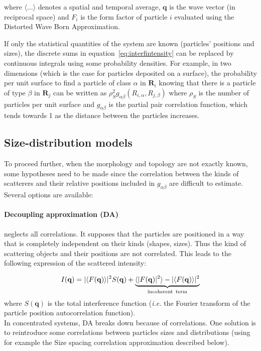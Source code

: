 where $\langle\ldots\rangle$ denotes a spatial and temporal average, $\mathbf{q}$ is the wave vector (in reciprocal space) and $F_i$ is the form factor of particle $i$ evaluated using the Distorted Wave Born Approximation. 

If only the statistical quantities of the system are known (particles' positions and sizes), the discrete sums in equation~\ref{eq:interfintensity} can be replaced by continuous integrals using some probability densities. For example, in two dimensions (which is the case for particles deposited on a surface), the probability per unit surface to find a particle of class $\alpha$ in $\mathbf{R}_{i}$ knowing that there is a particle of type $\beta$ in $\mathbf{R}_{j}$ can be written as  $\rho_S^2 g_{\alpha \beta}(R_{i,\alpha},R_{j,\beta})$ where $\rho_S$ is the number of particles  per unit surface and $g_{\alpha \beta}$ is the partial pair correlation function, which tends towards 1 as the distance between the particles increases.


\subsection{Size-distribution models}

To proceed further, when the morphology and topology are not exactly known, some hypotheses need to be made since the correlation between the kinds of scatterers and their relative positions included in $g_{\alpha \beta}$ are difficult to estimate. Several options are available:

\paragraph{Decoupling approximation (DA)} neglects all correlations. It supposes that the particles are positioned in a way that is completely independent on their kinds (shapes, sizes). Thus the kind of scattering objects and their positions are not correlated. This leads to the following expression of the scattered intensity:

\begin{equation*}
I(\mathbf{q})= |\langle F(\mathbf{q})\rangle |^2 S(\mathbf{q})+ \underbrace{\langle |F(\mathbf{q})|^2\rangle-|\langle F(\mathbf{q})\rangle |^2}_{\text{incoherent\, term}}
\end{equation*}
where $S(\mathbf{q})$ is the total interference function (\textit{i.e.} the Fourier transform of the particle position autocorrelation function).\\
In concentrated systems, DA breaks down because of correlations. One solution is to reintroduce some correlations between particles sizes and distributions (using for example the Size spacing correlation approximation described below). 

